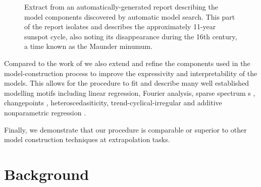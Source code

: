 \documentclass{article}
\begin{document}
\begin{figure}[t]
\centering
{}
\caption{Extract from an automatically-generated report describing the model components discovered by automatic model search.  This part of the report isolates and describes the approximately 11-year sunspot cycle, also noting its disappearance during the 16th century, a time known as the Maunder minumum.}
\label{fig:periodic}
\end{figure}

Compared to the work of \cite{DuvLloGroetal13} we also extend and refine the components used in the model-construction process to improve the expressivity and interpretability of the models.
This allows for the procedure to fit and describe many well established modelling motifs including linear regression, Fourier analysis, sparse spectrum \gp{}s \citep{lazaro2010sparse}, changepoints \citep[e.g.][]{garnett2010sequential, FoxDunson:NIPS2012}, heteroscedasiticity, trend-cyclical-irregular \citep[e.g.][]{lind2006basic} and additive nonparametric regression \citep[e.g.][]{buja1989linear}.

Finally, we demonstrate that our procedure is comparable or superior to other model construction techniques at extrapolation tasks.

\section{Background}
\label{sec:gpss}
\end{document}
